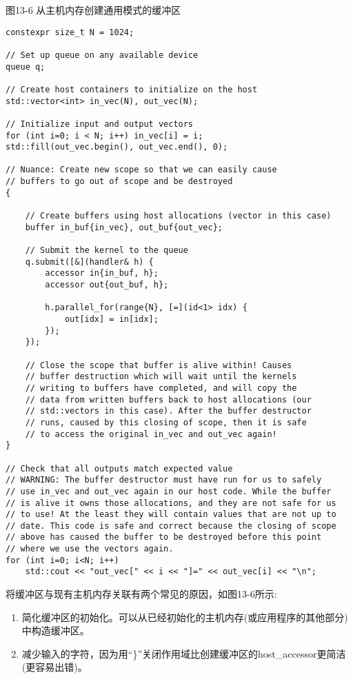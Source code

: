 \hspace*{\fill} \par %
图13-6 从主机内存创建通用模式的缓冲区
\begin{lstlisting}[caption={}]
constexpr size_t N = 1024;

// Set up queue on any available device
queue q;

// Create host containers to initialize on the host
std::vector<int> in_vec(N), out_vec(N);

// Initialize input and output vectors
for (int i=0; i < N; i++) in_vec[i] = i;
std::fill(out_vec.begin(), out_vec.end(), 0);

// Nuance: Create new scope so that we can easily cause
// buffers to go out of scope and be destroyed
{
	
	// Create buffers using host allocations (vector in this case)
	buffer in_buf{in_vec}, out_buf{out_vec};
	
	// Submit the kernel to the queue
	q.submit([&](handler& h) {
		accessor in{in_buf, h};
		accessor out{out_buf, h};
		
		h.parallel_for(range{N}, [=](id<1> idx) {
			out[idx] = in[idx];
		});
	});

	// Close the scope that buffer is alive within! Causes
	// buffer destruction which will wait until the kernels
	// writing to buffers have completed, and will copy the
	// data from written buffers back to host allocations (our
	// std::vectors in this case). After the buffer destructor
	// runs, caused by this closing of scope, then it is safe
	// to access the original in_vec and out_vec again!
}

// Check that all outputs match expected value
// WARNING: The buffer destructor must have run for us to safely
// use in_vec and out_vec again in our host code. While the buffer
// is alive it owns those allocations, and they are not safe for us
// to use! At the least they will contain values that are not up to
// date. This code is safe and correct because the closing of scope
// above has caused the buffer to be destroyed before this point
// where we use the vectors again.
for (int i=0; i<N; i++) 
	std::cout << "out_vec[" << i << "]=" << out_vec[i] << "\n";
\end{lstlisting}

将缓冲区与现有主机内存关联有两个常见的原因，如图13-6所示:\par

\begin{enumerate}
	\item 简化缓冲区的初始化。可以从已经初始化的主机内存(或应用程序的其他部分)中构造缓冲区。
	\item 减少输入的字符，因为用“\}”关闭作用域比创建缓冲区的host\_accessor更简洁(更容易出错)。
\end{enumerate}


